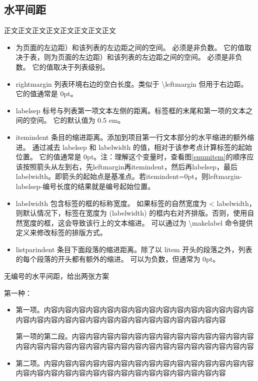 \subsection{水平间距}
正文正文正文正文正文正文正文正文
\begin{itemize}[topsep = 0 pt, itemsep= 0 pt, parsep=0pt, partopsep=0pt, leftmargin=36pt, itemindent=0pt, labelsep=6pt, listparindent=24pt]
	\item 为页面的左边距）和该列表的左边距之间的空间。 必须是非负数。 它的值取决于表，则为页面的左边距）和该列表的左边距之间的空间。 必须是非负数。 它的值取决于列表级别。
	\item rightmargin       列表环境右边的空白长度。类似于 \textbackslash{}leftmargin 但用于右边距。 它的值通常是 0pt。
	\item labelsep       标号与列表第一项文本左侧的距离。标签框的末尾和第一项的文本之间的空间。 它的默认值为 0.5 em。
	\item itemindent       条目的缩进距离。添加到项目第一行文本部分的水平缩进的额外缩进。 通过减去 labelsep 和 labelwidth 的值，相对于该参考点计算标签的起始位置。 它的值通常是 0pt。注：理解这个变量时，查看图\ref{enumitem}的顺序应该按照箭头从左到右，先leftmargin再itemindent，然后再labelsep，最后labelwidth。即箭头的起始点是基准点。若itemindent=0pt，则leftmargin-labelsep-编号长度的结果就是编号起始位置。
	\item labelwidth       包含标签的框的标称宽度。 如果标签的自然宽度为 < labelwidth，则默认情况下，标签在宽度为 (labelwidth) 的框内右对齐排版。否则，使用自然宽度的框，这会导致该行上的文本缩进。 可以通过为 \textbackslash{}makelabel 命令提供定义来修改标签的排版方式。
	\item listparindent       条目下面段落的缩进距离。除了以 litem 开头的段落之外，列表的每个段落的开头都有额外的缩进。 可以为负数，但通常为 0pt。
\end{itemize}

无编号的水平间距，给出两张方案
 
第一种：
\begin{itemize}[topsep = 0 pt, itemsep= 0 pt, parsep=0pt, partopsep=0pt, leftmargin=0pt, itemindent=36pt, labelsep=6pt, listparindent=24pt]
	\item 第一项。内容内容内容内容内容内容内容内容内容内容内容内容内容内容内容内容内容内容内容内容内容内容内容内容内容内容内容内容内容内容

	第一项的第二段。内容内容内容内容内容内容内容内容内容内容内容内容内容内容内容内容内容内容内容内容内容内容内容内容内容内容内容内容内容内容
	\item 第二项。内容内容内容内容内容内容内容内容内容内容内容内容内容内容内容内容内容内容内容内容内容内容内容内容内容内容内容内容内容内容
	
\end{itemize}

